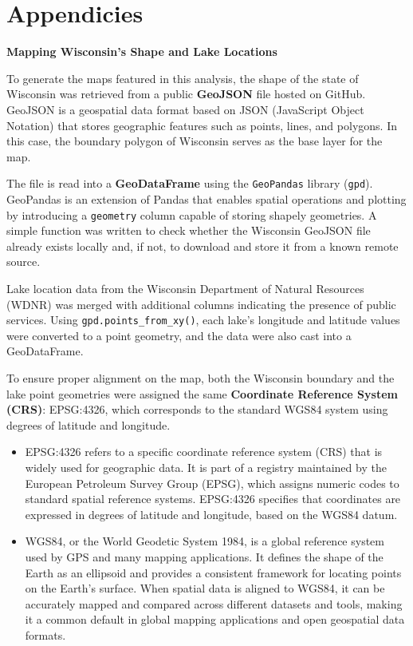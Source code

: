 \documentclass[
]{article}
\begin{document}
\section{Appendicies}\label{appendicies}

\textbf{Mapping Wisconsin's Shape and Lake Locations}

To generate the maps featured in this analysis, the shape of the state
of Wisconsin was retrieved from a public \textbf{GeoJSON} file hosted on
GitHub. GeoJSON is a geospatial data format based on JSON (JavaScript
Object Notation) that stores geographic features such as points, lines,
and polygons. In this case, the boundary polygon of Wisconsin serves as
the base layer for the map.

The file is read into a \textbf{GeoDataFrame} using the
\texttt{GeoPandas} library (\texttt{gpd}). GeoPandas is an extension of
Pandas that enables spatial operations and plotting by introducing a
\texttt{geometry} column capable of storing shapely geometries. A simple
function was written to check whether the Wisconsin GeoJSON file already
exists locally and, if not, to download and store it from a known remote
source.

Lake location data from the Wisconsin Department of Natural Resources
(WDNR) was merged with additional columns indicating the presence of
public services. Using \texttt{gpd.points\_from\_xy()}, each lake's
longitude and latitude values were converted to a point geometry, and
the data were also cast into a GeoDataFrame.

To ensure proper alignment on the map, both the Wisconsin boundary and
the lake point geometries were assigned the same \textbf{Coordinate
Reference System (CRS)}: EPSG:4326, which corresponds to the standard
WGS84 system using degrees of latitude and longitude.

\begin{itemize}
\item
  EPSG:4326 refers to a specific coordinate reference system (CRS) that
  is widely used for geographic data. It is part of a registry
  maintained by the European Petroleum Survey Group (EPSG), which
  assigns numeric codes to standard spatial reference systems. EPSG:4326
  specifies that coordinates are expressed in degrees of latitude and
  longitude, based on the WGS84 datum.
\item
  WGS84, or the World Geodetic System 1984, is a global reference system
  used by GPS and many mapping applications. It defines the shape of the
  Earth as an ellipsoid and provides a consistent framework for locating
  points on the Earth's surface. When spatial data is aligned to WGS84,
  it can be accurately mapped and compared across different datasets and
  tools, making it a common default in global mapping applications and
  open geospatial data formats.
\end{itemize}
\end{document}
